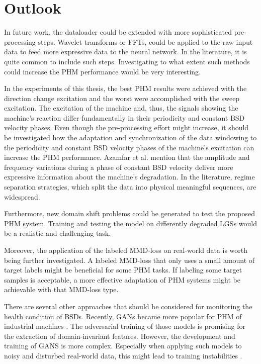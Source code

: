 \chapter{Outlook}
In future work, the dataloader could be extended with more sophisticated pre-processing steps. Wavelet transforms or FFTs, could be applied to the raw input data to feed more expressive data to the neural network. In the literature, it is quite common to include such steps. Investigating to what extent such methods could increase the PHM performance would be very interesting.

In the experiments of this thesis, the best PHM results were achieved with the direction change excitation and the worst were accomplished with the sweep excitation. The excitation of the machine and, thus, the signals showing the machine’s reaction differ fundamentally in their periodicity and constant BSD velocity phases. Even though the pre-processing effort might increase, it should be investigated how the adaptation and synchronization of the data windowing to the periodicity and constant BSD velocity phases of the machine's excitation can increase the PHM performance. Azamfar et al. \cite{AZAMFAR2020103932} mention that the amplitude and frequency variations during a phase of constant BSD velocity deliver more expressive information about the machine's degradation. In the literature, regime separation strategies, which split the data into physical meaningful sequences, are widespread.

Furthermore, new domain shift problems could be generated to test the proposed PHM system. Training and testing the model on differently degraded LGSs would be a realistic and challenging task.

Moreover, the application of the labeled MMD-loss on real-world data is worth being further investigated. A labeled MMD-loss that only uses a small amount of target labels might be beneficial for some PHM tasks. If labeling some target samples is acceptable, a more effective adaptation of PHM systems might be achievable with that MMD-loss type.

There are several other approaches that should be considered for monitoring the health condition of BSDs. Recently, GANs became more popular for PHM of industrial machines \cite{Zhang2019}. The adversarial training of those models is promising for the extraction of domain-invariant features. However, the development and training of GANS is more complex. Especially when applying such models to noisy and disturbed real-world data, this might lead to training instabilities \cite{Zhang2019}. 




